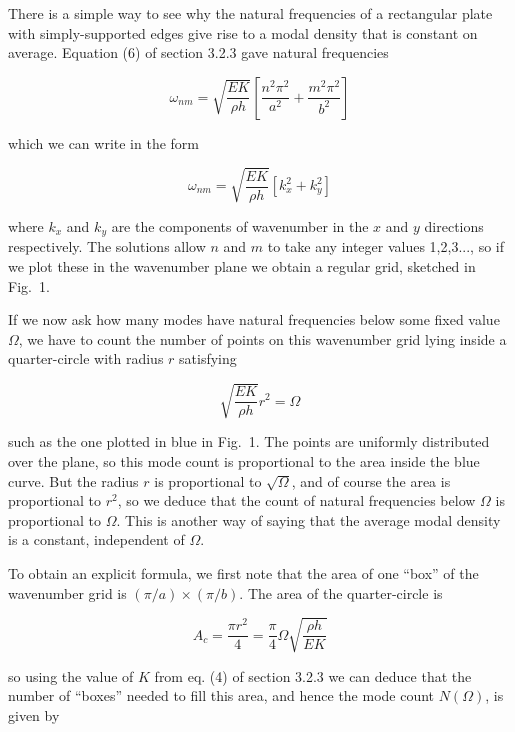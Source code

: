   There is a simple way to see why the natural frequencies of a rectangular 
  plate with simply-supported edges give rise to a modal density that is 
  constant on average. Equation (6) of section 3.2.3 gave natural frequencies 

  $$\omega_{nm} = \sqrt{\frac{EK}{\rho h}} \left[\frac{n^2 
  \pi^2}{a^2}+\frac{m^2 \pi^2}{b^2} \right] \tag{1}$$ 

  which we can write in the form 

  $$\omega_{nm} = \sqrt{\frac{EK}{\rho h}} \left[k_x^2+k_y^2 \right] \tag{2}$$ 

  where $k_x$ and $k_y$ are the components of wavenumber in the $x$ and $y$ 
  directions respectively. The solutions allow $n$ and $m$ to take any integer 
  values 1,2,3..., so if we plot these in the wavenumber plane we obtain a 
  regular grid, sketched in Fig.\ 1. 


  If we now ask how many modes have natural frequencies below some fixed value 
  $\Omega$, we have to count the number of points on this wavenumber grid lying 
  inside a quarter-circle with radius $r$ satisfying 

  $$\sqrt{\frac{EK}{\rho h}} r^2 = \Omega \tag{3}$$ 

  such as the one plotted in blue in Fig.\ 1. The points are uniformly 
  distributed over the plane, so this mode count is proportional to the area 
  inside the blue curve. But the radius $r$ is proportional to $\sqrt{\Omega}$, 
  and of course the area is proportional to $r^2$, so we deduce that the count 
  of natural frequencies below $\Omega$ is proportional to $\Omega$. This is 
  another way of saying that the average modal density is a constant, 
  independent of $\Omega$. 

  To obtain an explicit formula, we first note that the area of one ``box'' of 
  the wavenumber grid is $(\pi/a) \times (\pi/b)$. The area of the 
  quarter-circle is 

  $$A_c = \dfrac{\pi r^2}{4} = \dfrac{\pi}{4} \Omega \sqrt{\dfrac{\rho h}{EK}} 
  \tag{4}$$ 

  so using the value of $K$ from eq. (4) of section 3.2.3 we can deduce that 
  the number of ``boxes'' needed to fill this area, and hence the mode count 
  $N(\Omega)$, is given by 

